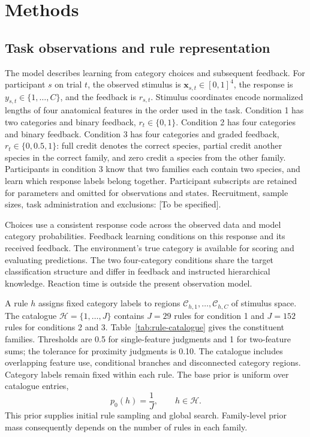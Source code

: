\section*{Methods}

\subsection*{Task observations and rule representation}
\label{m:task}

The model describes learning from category choices and subsequent feedback. For participant $s$ on trial $t$, the observed stimulus is $\bm x_{s,t}\in[0,1]^4$, the response is $y_{s,t}\in\{1,\ldots,C\}$, and the feedback is $r_{s,t}$. Stimulus coordinates encode normalized lengths of four anatomical features in the order used in the task. Condition 1 has two categories and binary feedback, $r_t\in\{0,1\}$. Condition 2 has four categories and binary feedback. Condition 3 has four categories and graded feedback, $r_t\in\{0,0.5,1\}$: full credit denotes the correct species, partial credit another species in the correct family, and zero credit a species from the other family. Participants in condition 3 know that two families each contain two species, and learn which response labels belong together. Participant subscripts are retained for parameters and omitted for observations and states. Recruitment, sample sizes, task administration and exclusions: [To be specified].

Choices use a consistent response code across the observed data and model category probabilities. Feedback learning conditions on this response and its received feedback. The environment's true category is available for scoring and evaluating predictions. The two four-category conditions share the target classification structure and differ in feedback and instructed hierarchical knowledge. Reaction time is outside the present observation model.

A rule $h$ assigns fixed category labels to regions $\mathcal C_{h,1},\ldots,\mathcal C_{h,C}$ of stimulus space. The catalogue $\mathcal H=\{1,\ldots,J\}$ contains $J=29$ rules for condition 1 and $J=152$ rules for conditions 2 and 3. Table~\ref{tab:rule-catalogue} gives the constituent families. Thresholds are 0.5 for single-feature judgments and 1 for two-feature sums; the tolerance for proximity judgments is 0.10. The catalogue includes overlapping feature use, conditional branches and disconnected category regions. Category labels remain fixed within each rule. The base prior is uniform over catalogue entries,
\begin{equation}
p_0(h)=\frac{1}{J},\qquad h\in\mathcal H.
\label{eq:catalogue-prior}
\end{equation}
This prior supplies initial rule sampling and global search. Family-level prior mass consequently depends on the number of rules in each family.

